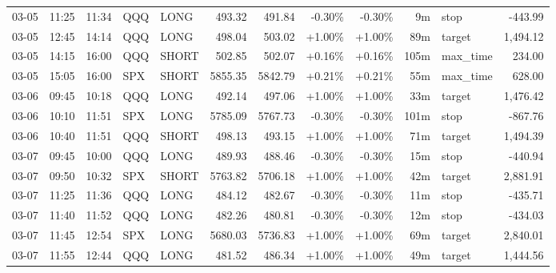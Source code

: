 \documentclass[11pt,a4paper]{article}
\begin{document}
\begin{center}
\begin{longtable}{>{\color{txtmain}}l l l l l r r r r r >{\color{txtmain}}l r}
03-05 & 11:25 & 11:34 & QQQ & LONG & 493.32 & 491.84 & \textcolor{lossred}{-0.30\%} & \textcolor{lossred}{-0.30\%} & 9m & stop & \textcolor{lossred}{-443.99} \\
03-05 & 12:45 & 14:14 & QQQ & LONG & 498.04 & 503.02 & \textcolor{wingreen}{+1.00\%} & \textcolor{wingreen}{+1.00\%} & 89m & target & \textcolor{wingreen}{1,494.12} \\
03-05 & 14:15 & 16:00 & QQQ & SHORT & 502.85 & 502.07 & \textcolor{wingreen}{+0.16\%} & \textcolor{wingreen}{+0.16\%} & 105m & max\_time & \textcolor{wingreen}{234.00} \\
03-05 & 15:05 & 16:00 & SPX & SHORT & 5855.35 & 5842.79 & \textcolor{wingreen}{+0.21\%} & \textcolor{wingreen}{+0.21\%} & 55m & max\_time & \textcolor{wingreen}{628.00} \\
03-06 & 09:45 & 10:18 & QQQ & LONG & 492.14 & 497.06 & \textcolor{wingreen}{+1.00\%} & \textcolor{wingreen}{+1.00\%} & 33m & target & \textcolor{wingreen}{1,476.42} \\
03-06 & 10:10 & 11:51 & SPX & LONG & 5785.09 & 5767.73 & \textcolor{lossred}{-0.30\%} & \textcolor{lossred}{-0.30\%} & 101m & stop & \textcolor{lossred}{-867.76} \\
03-06 & 10:40 & 11:51 & QQQ & SHORT & 498.13 & 493.15 & \textcolor{wingreen}{+1.00\%} & \textcolor{wingreen}{+1.00\%} & 71m & target & \textcolor{wingreen}{1,494.39} \\
03-07 & 09:45 & 10:00 & QQQ & LONG & 489.93 & 488.46 & \textcolor{lossred}{-0.30\%} & \textcolor{lossred}{-0.30\%} & 15m & stop & \textcolor{lossred}{-440.94} \\
03-07 & 09:50 & 10:32 & SPX & SHORT & 5763.82 & 5706.18 & \textcolor{wingreen}{+1.00\%} & \textcolor{wingreen}{+1.00\%} & 42m & target & \textcolor{wingreen}{2,881.91} \\
03-07 & 11:25 & 11:36 & QQQ & LONG & 484.12 & 482.67 & \textcolor{lossred}{-0.30\%} & \textcolor{lossred}{-0.30\%} & 11m & stop & \textcolor{lossred}{-435.71} \\
03-07 & 11:40 & 11:52 & QQQ & LONG & 482.26 & 480.81 & \textcolor{lossred}{-0.30\%} & \textcolor{lossred}{-0.30\%} & 12m & stop & \textcolor{lossred}{-434.03} \\
03-07 & 11:45 & 12:54 & SPX & LONG & 5680.03 & 5736.83 & \textcolor{wingreen}{+1.00\%} & \textcolor{wingreen}{+1.00\%} & 69m & target & \textcolor{wingreen}{2,840.01} \\
03-07 & 11:55 & 12:44 & QQQ & LONG & 481.52 & 486.34 & \textcolor{wingreen}{+1.00\%} & \textcolor{wingreen}{+1.00\%} & 49m & target & \textcolor{wingreen}{1,444.56} \\

\end{longtable}
\end{center}
\end{document}
